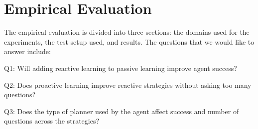 \documentclass[letterpaper]{article}
\newenvironment{packed_itemize}{
\begin{itemize}
  \setlength{\itemsep}{1pt}
  \setlength{\parskip}{0pt}
  \setlength{\parsep}{0pt}
}{\end{itemize}}
\begin{document}
 



\section{Empirical Evaluation}
The empirical evaluation is divided into three sections:  the domains used for
the experiments, the test setup used, and results.  The questions that we would like to answer
include:



\begin{packed_itemize}
  \item Q1: Will adding reactive learning to passive
  learning improve agent success?
  \item Q2: Does proactive learning improve reactive strategies without
  asking too many questions?
  \item Q3: Does the type of planner used by the agent affect success and number
  of questions across the strategies?
\end{packed_itemize}
\end{document}
